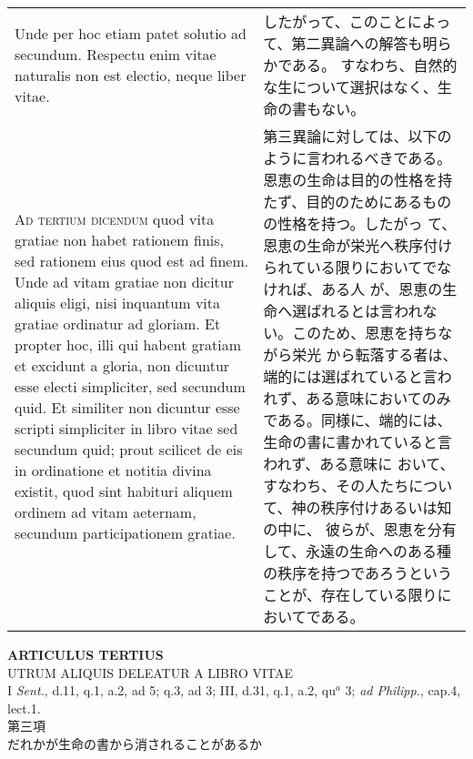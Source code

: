 \documentclass[10pt]{jsarticle} %
\begin{document}
\begin{longtable}{p{21em}p{21em}}
\\


Unde per hoc etiam patet solutio ad
 secundum. Respectu enim vitae naturalis non est electio, neque liber
 vitae.


&

したがって、このことによって、第二異論への解答も明らかである。
すなわち、自然的な生について選択はなく、生命の書もない。


\\


{\scshape Ad tertium dicendum} quod vita gratiae non
 habet rationem finis, sed rationem eius quod est ad finem. Unde ad
 vitam gratiae non dicitur aliquis eligi, nisi inquantum vita gratiae
 ordinatur ad gloriam. Et propter hoc, illi qui habent gratiam et
 excidunt a gloria, non dicuntur esse electi simpliciter, sed secundum
 quid. Et similiter non dicuntur esse scripti simpliciter in libro vitae
 sed secundum quid; prout scilicet de eis in ordinatione et notitia
 divina existit, quod sint habituri aliquem ordinem ad vitam aeternam,
 secundum participationem gratiae.


&

第三異論に対しては、以下のように言われるべきである。
恩恵の生命は目的の性格を持たず、目的のためにあるものの性格を持つ。したがっ
 て、恩恵の生命が栄光へ秩序付けられている限りにおいてでなければ、ある人
 が、恩恵の生命へ選ばれるとは言われない。このため、恩恵を持ちながら栄光
 から転落する者は、端的には選ばれていると言われず、ある意味においてのみ
 である。同様に、端的には、生命の書に書かれていると言われず、ある意味に
 おいて、すなわち、その人たちについて、神の秩序付けあるいは知の中に、
 彼らが、恩恵を分有して、永遠の生命へのある種の秩序を持つであろうという
 ことが、存在している限りにおいてである。






\end{longtable}
\newpage


\begin{center}
 {\Large {\bf ARTICULUS TERTIUS}}\\
 {\large UTRUM ALIQUIS DELEATUR A LIBRO VITAE}\\
 {\footnotesize I {\itshape Sent.}, d.11, q.1, a.2, ad 5; q.3, ad 3;
 III, d.31, q.1, a.2, qu$^a$ 3; {\itshape ad Philipp.}, cap.4, lect.1.}\\
 {\Large 第三項\\だれかが生命の書から消されることがあるか}
\end{center}
\end{document}
